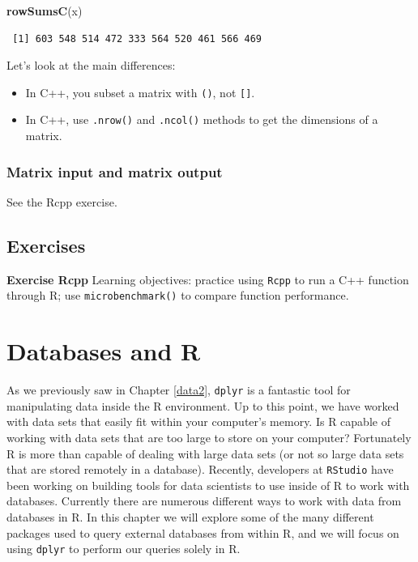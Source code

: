 \documentclass[
]{krantz}
\makeatletter
\newenvironment{Shaded}{\begin{snugshade}}{\end{snugshade}}
\newcommand{\KeywordTok}[1]{\textcolor[rgb]{0.27,0.27,0.27}{\textbf{#1}}}
\newcommand{\NormalTok}[1]{#1}
\providecommand{\tightlist}{%
  \setlength{\itemsep}{0pt}\setlength{\parskip}{0pt}}
\newenvironment{kframe}{%
\medskip{}
\setlength{\fboxsep}{.8em}
 \def\at@end@of@kframe{}%
 \ifinner\ifhmode%
  \def\at@end@of@kframe{\end{minipage}}%
  \begin{minipage}{\columnwidth}%
 \fi\fi%
 \def\FrameCommand##1{\hskip\@totalleftmargin \hskip-\fboxsep
 \colorbox{shadecolor}{##1}\hskip-\fboxsep
     \hskip-\linewidth \hskip-\@totalleftmargin \hskip\columnwidth}%
 \MakeFramed {\advance\hsize-\width
   \@totalleftmargin\z@ \linewidth\hsize
   \@setminipage}}%
 {\par\unskip\endMakeFramed%
 \at@end@of@kframe}
\renewenvironment{Shaded}{\begin{kframe}}{\end{kframe}}
\makeatother
\begin{document}
\begin{Shaded}
\begin{Highlighting}[]
\KeywordTok{rowSumsC}\NormalTok{(x)}
\end{Highlighting}
\end{Shaded}

\begin{verbatim}
 [1] 603 548 514 472 333 564 520 461 566 469
\end{verbatim}

Let's look at the main differences:

\begin{itemize}
\tightlist
\item
  In C++, you subset a matrix with \texttt{()}, not \texttt{{[}{]}}.
\item
  In C++, use \texttt{.nrow()} and \texttt{.ncol()} methods to get the dimensions of a matrix.
\end{itemize}

\hypertarget{matrix-input-and-matrix-output}{%
\subsection{Matrix input and matrix output}\label{matrix-input-and-matrix-output}}

See the Rcpp exercise.

\hypertarget{exCPP}{%
\section{Exercises}\label{exCPP}}

\textbf{Exercise Rcpp} Learning objectives: practice using \texttt{Rcpp} to run a C++ function through R; use \texttt{microbenchmark()} to compare function performance.

\hypertarget{databases-and-r}{%
\chapter{Databases and R}\label{databases-and-r}}

As we previously saw in Chapter \ref{data2}, \texttt{dplyr} is a fantastic tool for manipulating data inside the R environment. Up to this point, we have worked with data sets that easily fit within your computer's memory. Is R capable of working with data sets that are too large to store on your computer? Fortunately R is more than capable of dealing with large data sets (or not so large data sets that are stored remotely in a database). Recently, developers at \texttt{RStudio} have been working on building tools for data scientists to use inside of R to work with databases. Currently there are numerous different ways to work with data from databases in R. In this chapter we will explore some of the many different packages used to query external databases from within R, and we will focus on using \texttt{dplyr} to perform our queries solely in R.
\end{document}
